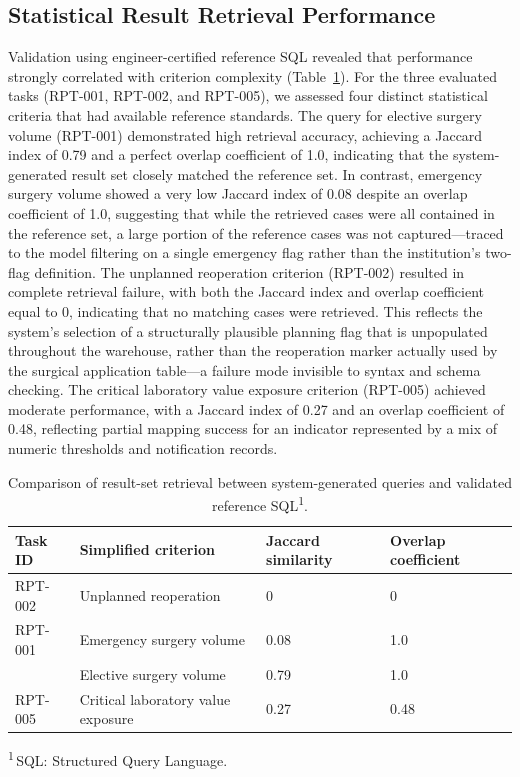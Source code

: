 \documentclass[applsci,article,submit,pdftex,oneauthor]{Definitions/mdpi}
\newcommand{\tnote}[1]{\textsuperscript{#1}}
\newcommand{\tabfoot}[1]{\par\vspace{2pt}\begingroup\raggedright\footnotesize
  \noindent #1\par\endgroup}
\newcommand{\tnotedef}[1]{\textsuperscript{#1}\,}
\begin{document}
\subsection{Statistical Result Retrieval Performance}
Validation using engineer-certified reference SQL revealed that performance
strongly correlated with criterion complexity (Table~\ref{tab:retrieval}). For
the three evaluated tasks (RPT-001, RPT-002, and RPT-005), we assessed four
distinct statistical criteria that had available reference standards. The query
for elective surgery volume (RPT-001) demonstrated high retrieval accuracy,
achieving a Jaccard index of 0.79 and a perfect overlap coefficient of 1.0,
indicating that the system-generated result set closely matched the reference
set. In contrast, emergency surgery volume showed a very low Jaccard index of 0.08 despite an overlap coefficient of 1.0, suggesting that while the retrieved
cases were all contained in the reference set, a large portion of the reference
cases was not captured---traced to the model filtering on a single emergency
flag rather than the institution's two-flag definition. The unplanned
reoperation criterion (RPT-002) resulted in complete retrieval failure, with
both the Jaccard index and overlap coefficient equal to 0, indicating that no
matching cases were retrieved. This reflects the system's selection of a
structurally plausible planning flag that is unpopulated throughout the
warehouse, rather than the reoperation marker actually used by the surgical
application table---a failure mode invisible to syntax and schema checking. The
critical laboratory value exposure criterion (RPT-005) achieved moderate
performance, with a Jaccard index of 0.27 and an overlap coefficient of 0.48,
reflecting partial mapping success for an indicator represented by a mix of
numeric thresholds and notification records.

\begin{table}[H]
\caption{Comparison of result-set retrieval between system-generated queries and
validated reference SQL\tnote{1}.}
\label{tab:retrieval}
\centering
\footnotesize
\begin{tabular*}{\linewidth}{@{\extracolsep{\fill}}llll@{}}
\toprule
Task ID & Simplified criterion & Jaccard similarity & Overlap coefficient\\
\midrule
RPT-002 & Unplanned reoperation                & 0    & 0\\
RPT-001 & Emergency surgery volume             & 0.08 & 1.0\\
        & Elective surgery volume              & 0.79 & 1.0\\
RPT-005 & Critical laboratory value exposure   & 0.27 & 0.48\\
\bottomrule
\end{tabular*}
\tabfoot{\tnotedef{1}SQL: Structured Query Language.}
\end{table}
\end{document}
